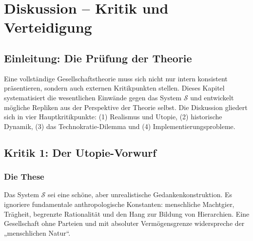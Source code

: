 
\chapter{Diskussion – Kritik und Verteidigung}
\label{chap:diskussion}

\section{Einleitung: Die Prüfung der Theorie}
Eine vollständige Gesellschaftstheorie muss sich nicht nur intern konsistent präsentieren, sondern auch externen Kritikpunkten stellen. Dieses Kapitel systematisiert die wesentlichen Einwände gegen das System $\mathcal{S}$ und entwickelt mögliche Repliken aus der Perspektive der Theorie selbst. Die Diskussion gliedert sich in vier Hauptkritikpunkte: (1) Realismus und Utopie, (2) historische Dynamik, (3) das Technokratie-Dilemma und (4) Implementierungsprobleme.

\section{Kritik 1: Der Utopie-Vorwurf}

\subsection{Die These}
Das System $\mathcal{S}$ sei eine schöne, aber unrealistische Gedankenkonstruktion. Es ignoriere fundamentale anthropologische Konstanten: menschliche Machtgier, Trägheit, begrenzte Rationalität und den Hang zur Bildung von Hierarchien. Eine Gesellschaft ohne Parteien und mit absoluter Vermögensgrenze widerspreche der „menschlichen Natur“.

